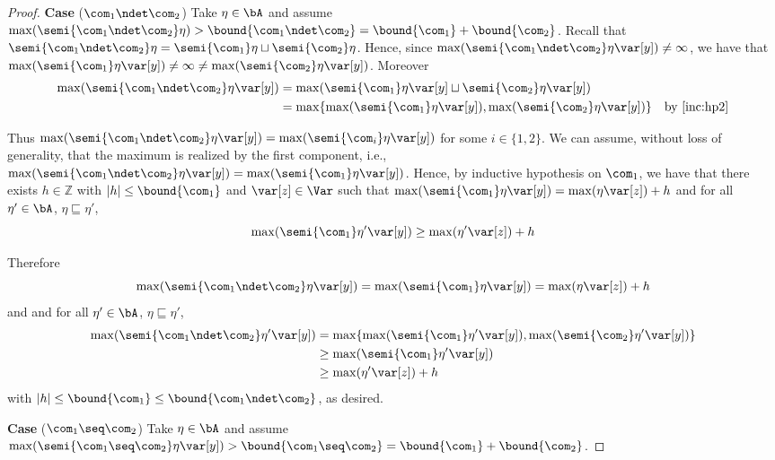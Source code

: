 \begin{proof}
  \noindent
  \textbf{Case} (\(\com_1 \ndet \com_2\))
  Take \(\eta \in \bA\) and assume
  \(\max(\semi{\com_1 \ndet \com_2}\eta) > \bound{\com_1 \ndet \com_2}
  = \bound{\com_1} + \bound{\com_2}\).  Recall that
  \(\semi{\com_1 \ndet \com_2} \eta = \semi{\com_1}\eta \sqcup
  \semi{\com_2}\eta\).
  Hence, since
  \(\max(\semi{\com_1 \ndet \com_2} \eta \var[y]) \neq \infty\), we
  have that
  \(\max(\semi{\com_1} \eta \var[y]) \neq \infty \neq
  \max(\semi{\com_2}\eta \var[y])\).  Moreover
  \begin{align*}
    \max(\semi{\com_1 \ndet \com_2}\eta \var[y])& =  \max(\semi{\com_1}\eta \var[y] \sqcup \semi{\com_2}\eta \var[y]) \\ 
    & = \max \{ \max(\semi{\com_1}\eta \var[y]), \max(\semi{\com_2}\eta \var[y])\} & \text{by \ref{inc:hp2}} 
  \end{align*}

  Thus
  \(\max(\semi{\com_1 \ndet \com_2}\eta \var[y]) =
  \max(\semi{\com_i}\eta \var[y])\) for some \(i \in \{1,2\}\). We can
  assume, without loss of generality, that the maximum is realized
  by the first component, i.e.,
  \(\max(\semi{\com_1 \ndet \com_2}\eta \var[y]) =
  \max(\semi{\com_1}\eta \var[y])\). Hence, by inductive hypothesis on
  \(\com_1\), we have that there exists \(h \in \mathbb{Z}\) with
  \(|h| \leq \bound{\com_1}\) and \(\var[z] \in \Var\) such that
  \(\max(\semi{\com_1}\eta \var[y]) = \max(\eta \var[z]) + h\) and for
  all \(\eta' \in \bA\), \(\eta \sqsubseteq \eta'\),
  \[
  \max(\semi{\com_1}\eta' \var[y]) \geq \max(\eta' \var[z]) + h
  \]

  Therefore 
  \[
  \max(\semi{\com_1 \ndet \com_2}\eta \var[y])
  = \max(\semi{\com_1}\eta \var[y]) = \max(\eta \var[z]) + h
  \]
  and and for
  all \(\eta' \in \bA\), \(\eta \sqsubseteq \eta'\),
  \begin{align*}
    \max(\semi{\com_1 \ndet \com_2}\eta' \var[y])
    &= \max\{ \max(\semi{\com_1}\eta' \var[y]),  \max(\semi{\com_2}\eta' \var[y])\}\\
    & \geq \max(\semi{\com_1}\eta' \var[y])\\
    & \geq \max(\eta' \var[z]) + h
  \end{align*}
  with \(|h| \leq \bound{\com_1} \leq \bound{\com_1 \ndet \com_2}\), as desired.

  
  \medskip
  
  \noindent
  \textbf{Case} (\(\com_1 \seq \com_2\))
  Take \(\eta \in \bA\) and assume
  \(\max(\semi{\com_1 \seq \com_2}\eta\var[y]) > \bound{\com_1 \seq
    \com_2} = \bound{\com_1} + \bound{\com_2}\).
  

\end{proof}
